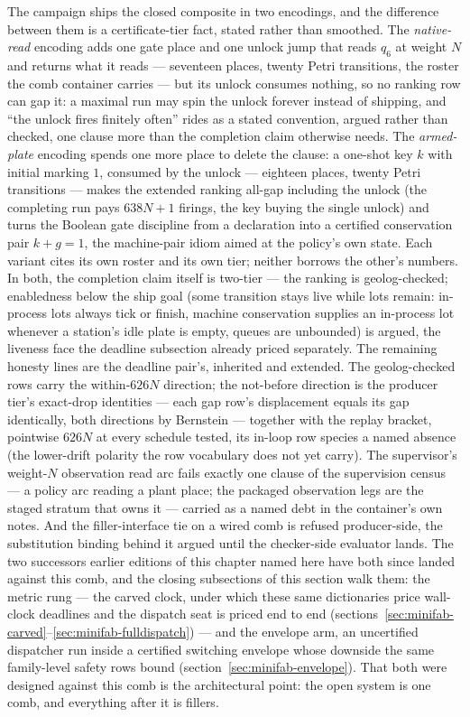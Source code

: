 The campaign ships the closed composite in two encodings, and the
difference between them is a certificate-tier fact, stated rather
than smoothed. The \emph{native-read} encoding adds one gate place
and one unlock jump that reads $q_6$ at weight $N$ and returns what
it reads --- seventeen places, twenty Petri transitions, the roster
the comb container carries --- but its unlock consumes nothing, so
no ranking row can gap it: a maximal run may spin the unlock
forever instead of shipping, and ``the unlock fires finitely
often'' rides as a stated convention, argued rather than checked,
one clause more than the completion claim otherwise needs. The \emph{armed-plate} encoding
spends one more place to delete the clause: a one-shot key $k$ with
initial marking $1$, consumed by the unlock --- eighteen places,
twenty Petri transitions --- makes the extended ranking all-gap
including the unlock (the completing run pays $638N + 1$ firings,
the key buying the single unlock) and turns the Boolean gate
discipline from a declaration into a certified conservation pair
$k + g = 1$, the machine-pair idiom aimed at the policy's own
state. Each variant cites its own roster and its own tier; neither
borrows the other's numbers. In both, the completion claim itself
is two-tier --- the ranking is geolog-checked; enabledness below the
ship goal (some transition stays live while lots remain: in-process
lots always tick or finish, machine conservation supplies an
in-process lot whenever a station's idle plate is empty, queues are
unbounded) is argued, the liveness face the deadline subsection
already priced separately. The remaining honesty lines are the
deadline pair's, inherited and extended. The geolog-checked rows
carry the
within-$626N$ direction; the not-before direction is the producer
tier's exact-drop identities --- each gap row's displacement equals
its gap identically, both directions by Bernstein --- together with
the replay bracket, pointwise $626N$ at every schedule tested, its
in-loop row species a named absence (the lower-drift polarity the
row vocabulary does not yet carry). The supervisor's weight-$N$
observation read arc fails exactly one clause of the supervision
census --- a policy arc reading a plant place; the packaged
observation legs are the staged stratum that owns it --- carried as
a named debt in the container's own notes. And the
filler-interface tie on a wired comb is refused producer-side, the
substitution binding behind it argued until the checker-side
evaluator lands. The two successors earlier editions of this
chapter named here have both since landed against this comb, and
the closing subsections of this section walk them: the metric rung ---
the carved clock, under which these same dictionaries price
wall-clock deadlines and the dispatch seat is priced end to end
(sections~\ref{sec:minifab-carved}--\ref{sec:minifab-fulldispatch})
--- and the envelope arm, an uncertified dispatcher run inside a
certified switching envelope whose downside the same family-level
safety rows bound (section~\ref{sec:minifab-envelope}). That both
were designed against this comb is the architectural point: the
open system is one comb, and everything after it is fillers.

